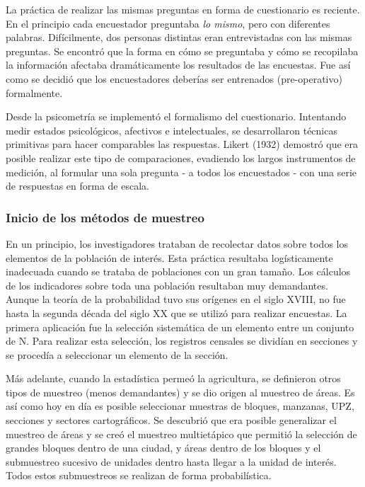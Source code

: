 \documentclass[
  10pt,
  spanish,
]{book}
\begin{document}
La práctica de realizar las mismas preguntas en forma de cuestionario es reciente. En el principio cada encuestador preguntaba \emph{lo mismo}, pero con diferentes palabras. Difícilmente, dos personas distintas eran entrevistadas con las mismas preguntas. Se encontró que la forma en cómo se preguntaba y cómo se recopilaba la información afectaba dramáticamente los resultados de las encuestas. Fue así como se decidió que los encuestadores deberías ser entrenados (pre-operativo) formalmente.

Desde la psicometría se implementó el formalismo del cuestionario. Intentando medir estados psicológicos, afectivos e intelectuales, se desarrollaron técnicas primitivas para hacer comparables las respuestas. Likert (1932) demostró que era posible realizar este tipo de comparaciones, evadiendo los largos instrumentos de medición, al formular una sola pregunta - a todos los encuestados - con una serie de respuestas en forma de escala.

\hypertarget{inicio-de-los-muxe9todos-de-muestreo}{%
\subsubsection*{Inicio de los métodos de muestreo}\label{inicio-de-los-muxe9todos-de-muestreo}}

En un principio, los investigadores trataban de recolectar datos sobre todos los elementos de la población de interés. Esta práctica resultaba logísticamente inadecuada cuando se trataba de poblaciones con un gran tamaño. Los cálculos de los indicadores sobre toda una población resultaban muy demandantes. Aunque la teoría de la probabilidad tuvo sus orígenes en el siglo XVIII, no fue hasta la segunda década del siglo XX que se utilizó para realizar encuestas. La primera aplicación fue la selección sistemática de un elemento entre un conjunto de N. Para realizar esta selección, los registros censales se dividían en secciones y se procedía a seleccionar un elemento de la sección.

Más adelante, cuando la estadística permeó la agricultura, se definieron otros tipos de muestreo (menos demandantes) y se dio origen al muestreo de áreas. Es así como hoy en día es posible seleccionar muestras de bloques, manzanas, UPZ, secciones y sectores cartográficos. Se descubrió que era posible generalizar el muestreo de áreas y se creó el muestreo multietápico que permitió la selección de grandes bloques dentro de una ciudad, y áreas dentro de los bloques y el submuestreo sucesivo de unidades dentro hasta llegar a la unidad de interés. Todos estos submuestreos se realizan de forma probabilística.
\end{document}
